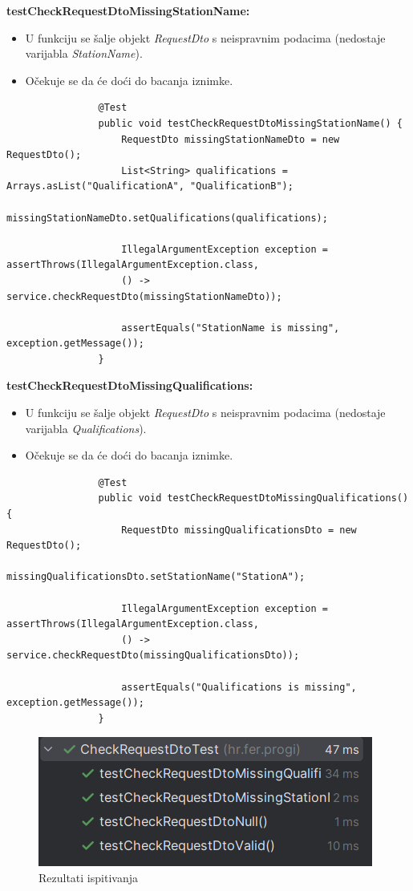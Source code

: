 			\textbf{testCheckRequestDtoMissingStationName:}
			\begin{itemize}
				\item U funkciju se šalje objekt \textit{RequestDto} s neispravnim podacima (nedostaje varijabla \textit{StationName}).
				\item Očekuje se da će doći do bacanja iznimke.
			\end{itemize}
			\begin{lstlisting}
				@Test
				public void testCheckRequestDtoMissingStationName() {
					RequestDto missingStationNameDto = new RequestDto();
					List<String> qualifications = Arrays.asList("QualificationA", "QualificationB");
					missingStationNameDto.setQualifications(qualifications);
					
					IllegalArgumentException exception = assertThrows(IllegalArgumentException.class,
					() -> service.checkRequestDto(missingStationNameDto));
					
					assertEquals("StationName is missing", exception.getMessage());
				}
			\end{lstlisting}
			
			\textbf{testCheckRequestDtoMissingQualifications:}
			\begin{itemize}
				\item U funkciju se šalje objekt \textit{RequestDto} s neispravnim podacima (nedostaje varijabla \textit{Qualifications}).
				\item Očekuje se da će doći do bacanja iznimke.
			\end{itemize}
			\begin{lstlisting}
				@Test
				public void testCheckRequestDtoMissingQualifications() {
					RequestDto missingQualificationsDto = new RequestDto();
					missingQualificationsDto.setStationName("StationA");
					
					IllegalArgumentException exception = assertThrows(IllegalArgumentException.class,
					() -> service.checkRequestDto(missingQualificationsDto));
					
					assertEquals("Qualifications is missing", exception.getMessage());
				}
			\end{lstlisting}
			
			\begin{figure}[H]
				\includegraphics[scale=1]{slike/checkRequestDtoTest.png} 
				\centering
				\caption{Rezultati ispitivanja}
				\label{fig:checkRequestDtoTest}
			\end{figure}
			
